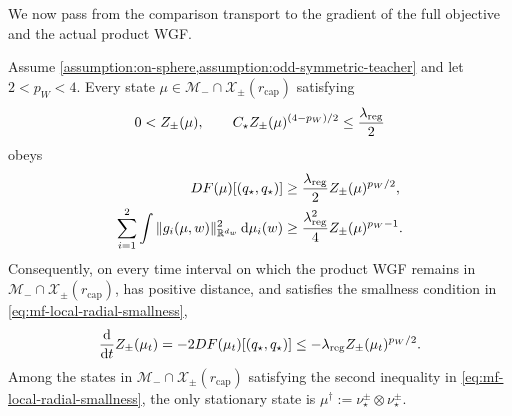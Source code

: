 We now pass from the comparison transport to the gradient of the full
objective and the actual product WGF.

\begin{proposition}
\label{lem:radial-positivity-antisymmetric-branch-full-density}
Assume \cref{assumption:on-sphere,assumption:odd-symmetric-teacher} and let
\(2<p_W<4\). Every state
\(\mu\in\mathcal M_-\cap\mathcal X_\pm(r_{\mathrm{cap}})\) satisfying
\begin{equation}
\label{eq:mf-local-radial-smallness}
 0<Z_\pm(\mu),\qquad
 C_\star Z_\pm(\mu)^{(4-p_W)/2}\le\frac{\lambda_{\mathrm{reg}}}{2}
\end{equation}
obeys
\begin{equation}
\label{eq:mf-local-radial-dissipation}
\begin{aligned}
 DF(\mu)[(q_\star,q_\star)]
 &\ge\frac{\lambda_{\mathrm{reg}}}{2}Z_\pm(\mu)^{p_W/2},\\
 \sum_{i=1}^2\int
 \|g_i(\mu,w)\|_{\mathbb R^{d_w}}^2\,\dd\mu_i(w)
 &\ge\frac{\lambda_{\mathrm{reg}}^2}{4}Z_\pm(\mu)^{p_W-1}.
\end{aligned}
\end{equation}
Consequently, on every time interval on which the product WGF remains in
\(\mathcal M_-\cap\mathcal X_\pm(r_{\mathrm{cap}})\), has positive distance,
and satisfies the smallness condition in
\cref{eq:mf-local-radial-smallness},
\begin{equation}
\label{eq:mf-local-distance-differential}
 \frac{\dd}{\dd t}Z_\pm(\mu_t)
 =-2DF(\mu_t)[(q_\star,q_\star)]
 \le-\lambda_{\mathrm{reg}} Z_\pm(\mu_t)^{p_W/2}.
\end{equation}
Among the states in
\(\mathcal M_-\cap\mathcal X_\pm(r_{\mathrm{cap}})\) satisfying the second
inequality in \cref{eq:mf-local-radial-smallness}, the only stationary state
is \(\mu^\dagger:=\nu_\star^\pm\otimes\nu_\star^\pm\).
\end{proposition}

